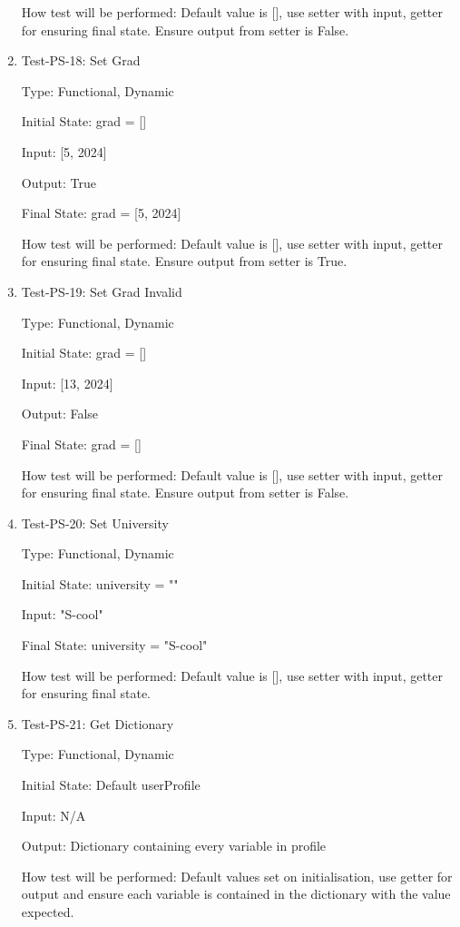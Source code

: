 \documentclass[12pt, titlepage]{article}
\makeatletter
\def\itemlabel#1#2{\def\@currentlabel{#2}\phantomsection\label{#1}}
\makeatother
\begin{document}
\begin{enumerate}
How test will be performed: Default value is [], use setter with input, getter for ensuring final state. Ensure output from setter is False.
\item{Test-PS-18: Set Grad\\}

Type: Functional, Dynamic

Initial State: grad = []

Input: [5, 2024]

Output: True

Final State: grad = [5, 2024]

How test will be performed: Default value is [], use setter with input, getter for ensuring final state. Ensure output from setter is True.
\item{Test-PS-19: Set Grad Invalid\\}

Type: Functional, Dynamic

Initial State: grad = []

Input: [13, 2024]

Output: False

Final State: grad = []

How test will be performed: Default value is [], use setter with input, getter for ensuring final state. Ensure output from setter is False.
\item{Test-PS-20: Set University\\}

Type: Functional, Dynamic

Initial State: university = ""

Input: "S-cool"

Final State: university = "S-cool"

How test will be performed: Default value is [], use setter with input, getter for ensuring final state.
\item{\itemlabel{item:PS-21}{Test-PS-21} Test-PS-21: Get Dictionary\\}

Type: Functional, Dynamic

Initial State: Default userProfile

Input: N/A

Output: Dictionary containing every variable in profile

How test will be performed: Default values set on initialisation, use getter for output and ensure each variable is contained in the dictionary with the value expected.

\end{enumerate}
		
\end{document}
